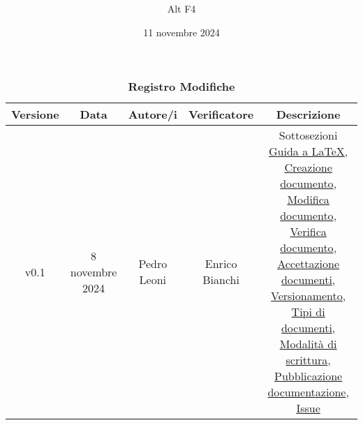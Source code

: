 \documentclass[a4paper, 12pt]{article}
\title{\Huge \textbf{\titolo}}
\author{\Large{Alt} \raisebox{0.3ex}{\normalsize  +} \Large{F4}}
\date{ 11 novembre 2024}
\def\logo{../Immagini/logo.jpeg}
\begin{document}
\begin{titlepage}      
    \maketitle
    \thispagestyle{empty}  

\end{titlepage}

\thispagestyle{plain}
\begin{table}[!h]
    \centering
    \caption*{\textbf{\Large Registro Modifiche}}
    {\renewcommand{\arraystretch}{2}
    \begin{tabularx}{\textwidth}{| c | c | C | C | C |}
        \hline
            \textbf{\normalsize Versione} & 
            \textbf{\normalsize Data} & 
            \textbf{\normalsize Autore/i} & 
            \textbf{\normalsize Verificatore} &
            \textbf{\normalsize Descrizione} \\ 
        \hline \hline
        v0.1 & 
        8 novembre 2024  & 
        Pedro Leoni &
        Enrico Bianchi & 
        Sottosezioni \hyperref[subsec:cre]{Guida a \LaTeX}, 
        \hyperref[subsec:cre]{Creazione documento}, \hyperref[subsec:cre]{Modifica documento}, \hyperref[subsec:ver]{Verifica documento}, \hyperref[subsec:acc]{Accettazione documenti}, \hyperref[subsec:vers]{Versionamento}, \hyperref[subsec:docs]{Tipi di documenti}, \hyperref[subsec:mod]{Modalità di scrittura}, \hyperref[subsec:pub]{Pubblicazione documentazione}, \hyperref[subsec:issue]{Issue}\\
        \hline 
    \end{tabularx}}
\end{table}
\restoregeometry
\end{document}
